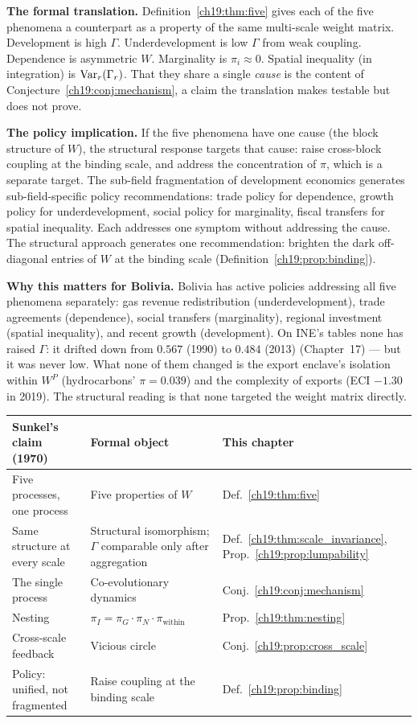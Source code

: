 \documentclass[../structural_economics_book.tex]{subfiles}
\begin{document}
\textbf{The formal translation.} Definition~\ref{ch19:thm:five} gives each of the five phenomena a counterpart as a property of the same multi-scale weight matrix. Development is high $\Gamma$. Underdevelopment is low $\Gamma$ from weak coupling. Dependence is asymmetric $W$. Marginality is $\pi_i \approx 0$. Spatial inequality (in integration) is $\operatorname{Var}_r(\Gamma_r)$. That they share a single \emph{cause} is the content of Conjecture~\ref{ch19:conj:mechanism}, a claim the translation makes testable but does not prove.

\textbf{The policy implication.} If the five phenomena have one cause (the block structure of $W$), the structural response targets that cause: raise cross-block coupling at the binding scale, and address the concentration of $\pi$, which is a separate target. The sub-field fragmentation of development economics generates sub-field-specific policy recommendations: trade policy for dependence, growth policy for underdevelopment, social policy for marginality, fiscal transfers for spatial inequality. Each addresses one symptom without addressing the cause. The structural approach generates one recommendation: brighten the dark off-diagonal entries of $W$ at the binding scale (Definition~\ref{ch19:prop:binding}).

\textbf{Why this matters for Bolivia.} Bolivia has active policies addressing all five phenomena separately: gas revenue redistribution (underdevelopment), trade agreements (dependence), social transfers (marginality), regional investment (spatial inequality), and recent growth (development). On INE's tables none has raised $\Gamma$: it drifted down from $0.567$ (1990) to $0.484$ (2013) (Chapter~17) --- but it was never low. What none of them changed is the export enclave's isolation within $W^P$ (hydrocarbons' $\pi = 0.039$) and the complexity of exports (ECI $-1.30$ in 2019). The structural reading is that none targeted the weight matrix directly.

\begin{center}
\begin{tabularx}{\textwidth}{LLL}
\toprule
\textbf{Sunkel's claim (1970)} & \textbf{Formal object} & \textbf{This chapter} \\
\midrule
Five processes, one process & Five properties of $W$ & Def.~\ref{ch19:thm:five} \\
Same structure at every scale & Structural isomorphism; $\Gamma$ comparable only after aggregation & Def.~\ref{ch19:thm:scale_invariance}, Prop.~\ref{ch19:prop:lumpability} \\
The single process & Co-evolutionary dynamics & Conj.~\ref{ch19:conj:mechanism} \\
Nesting & $\pi_I = \pi_G \cdot \pi_N \cdot \pi_{\text{within}}$ & Prop.~\ref{ch19:thm:nesting} \\
Cross-scale feedback & Vicious circle & Conj.~\ref{ch19:prop:cross_scale} \\
Policy: unified, not fragmented & Raise coupling at the binding scale & Def.~\ref{ch19:prop:binding} \\
\bottomrule
\end{tabularx}
\end{center}
\end{document}

